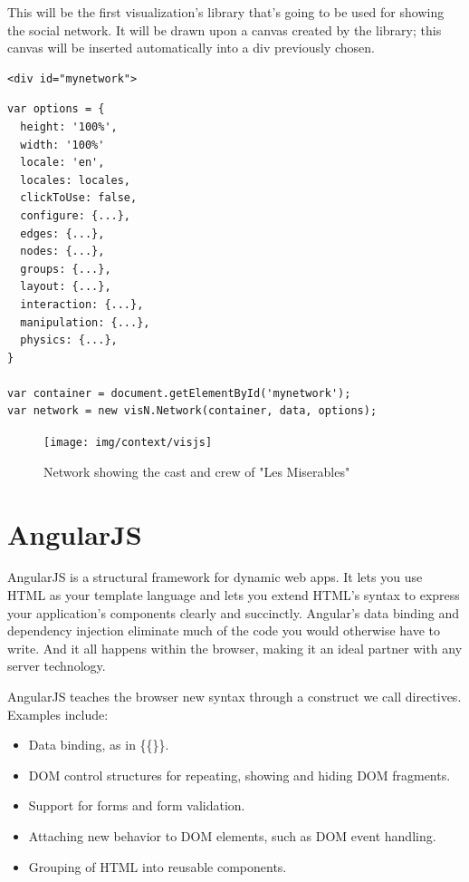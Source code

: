 \documentclass[a4paper, 12pt]{book}
\begin{document}
This will be the first visualization’s library that’s going to be used for showing the social network. It will be drawn upon a canvas created by the library; this canvas will be inserted automatically into a div previously chosen.

\begin{lstlisting}[frame=single]
<div id="mynetwork">
\end{lstlisting}

\begin{lstlisting}[frame=single]
var options = {
  height: '100%',
  width: '100%'
  locale: 'en',
  locales: locales,
  clickToUse: false,
  configure: {...},    
  edges: {...},        
  nodes: {...},
  groups: {...},       
  layout: {...},       
  interaction: {...},  
  manipulation: {...}, 
  physics: {...},      
}

var container = document.getElementById('mynetwork');
var network = new visN.Network(container, data, options);
\end{lstlisting}

\begin{figure}[H]
  \centering
  \texttt{[image: img/context/visjs]}
  \caption {Network showing the cast and crew of "Les Miserables"}
  \label{fig:visjsex}
\end{figure}

\section{AngularJS}
\label{sec:angular}
AngularJS is a structural framework for dynamic web apps. It lets you use HTML as your template language and lets you extend HTML's syntax to express your application's components clearly and succinctly. Angular's data binding and dependency injection eliminate much of the code you would otherwise have to write. And it all happens within the browser, making it an ideal partner with any server technology.

AngularJS teaches the browser new syntax through a construct we call directives. Examples include:

\begin{itemize}
\item Data binding, as in \{\{\}\}.
\item DOM control structures for repeating, showing and hiding DOM fragments.
\item Support for forms and form validation.
\item Attaching new behavior to DOM elements, such as DOM event handling.
\item Grouping of HTML into reusable components.
\end{itemize}
\end{document}
